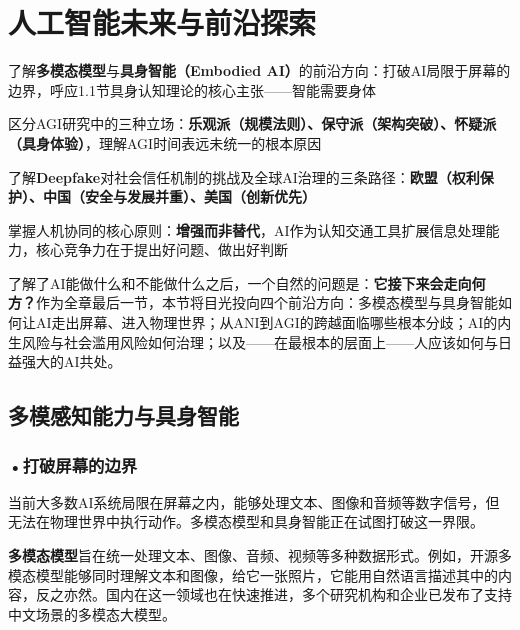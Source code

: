 \newpage

\section{人工智能未来与前沿探索}

\begin{sectionkeypoints}
\item 了解\textbf{多模态模型}与\textbf{具身智能（Embodied AI）}的前沿方向：打破AI局限于屏幕的边界，呼应1.1节具身认知理论的核心主张——智能需要身体
\item 区分AGI研究中的三种立场：\textbf{乐观派（规模法则）、保守派（架构突破）、怀疑派（具身体验）}，理解AGI时间表远未统一的根本原因
\item 了解\textbf{Deepfake}对社会信任机制的挑战及全球AI治理的三条路径：\textbf{欧盟（权利保护）、中国（安全与发展并重）、美国（创新优先）}
\item 掌握人机协同的核心原则：\textbf{增强而非替代}，AI作为认知交通工具扩展信息处理能力，核心竞争力在于提出好问题、做出好判断
\end{sectionkeypoints}

了解了AI能做什么和不能做什么之后，一个自然的问题是：\textbf{它接下来会走向何方？}作为全章最后一节，本节将目光投向四个前沿方向：多模态模型与具身智能如何让AI走出屏幕、进入物理世界；从ANI到AGI的跨越面临哪些根本分歧；AI的内生风险与社会滥用风险如何治理；以及——在最根本的层面上——人应该如何与日益强大的AI共处。

\subsection{多模感知能力与具身智能}

\subsubsection*{\textbf{•打破屏幕的边界}}

当前大多数AI系统局限在屏幕之内，能够处理文本、图像和音频等数字信号，但无法在物理世界中执行动作。多模态模型和具身智能正在试图打破这一界限。

\textbf{多模态模型}旨在统一处理文本、图像、音频、视频等多种数据形式。例如，开源多模态模型能够同时理解文本和图像，给它一张照片，它能用自然语言描述其中的内容，反之亦然。国内在这一领域也在快速推进，多个研究机构和企业已发布了支持中文场景的多模态大模型。

